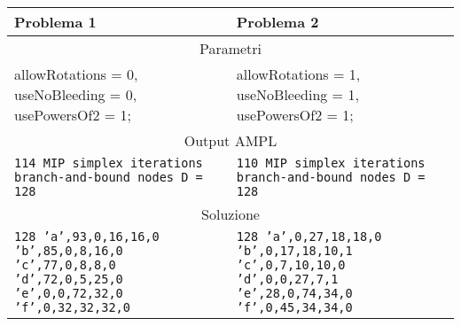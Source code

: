 \begin{table}[H]
\centering
\footnotesize
\begin{tabular}{p{6cm}|p{6cm}}
\textbf{Problema 1} & \textbf{Problema 2} \\ 
\hline
\multicolumn{2}{|c|}{Parametri} \\ 
\hline
allowRotations = 0,\newline
useNoBleeding = 0,\newline
usePowersOf2 = 1;	& 
allowRotations = 1,\newline
useNoBleeding = 1,\newline
usePowersOf2 = 1;	\\
\hline
\multicolumn{2}{|c|}{Output AMPL} \\
\hline
\texttt{114 MIP simplex iterations\newline
0 branch-and-bound nodes\newline
D = 128}
&
\texttt{110 MIP simplex iterations\newline
0 branch-and-bound nodes\newline
D = 128}
\\
\hline
\multicolumn{2}{|c|}{Soluzione} \\
\hline
\texttt{128\newline
'a',93,0,16,16,0\newline
'b',85,0,8,16,0\newline
'c',77,0,8,8,0\newline
'd',72,0,5,25,0\newline
'e',0,0,72,32,0\newline
'f',0,32,32,32,0}
&
\texttt{128\newline
'a',0,27,18,18,0\newline
'b',0,17,18,10,1\newline
'c',0,7,10,10,0\newline
'd',0,0,27,7,1\newline
'e',28,0,74,34,0\newline
'f',0,45,34,34,0}
\\
   
\end{tabular}
\end{table}

























